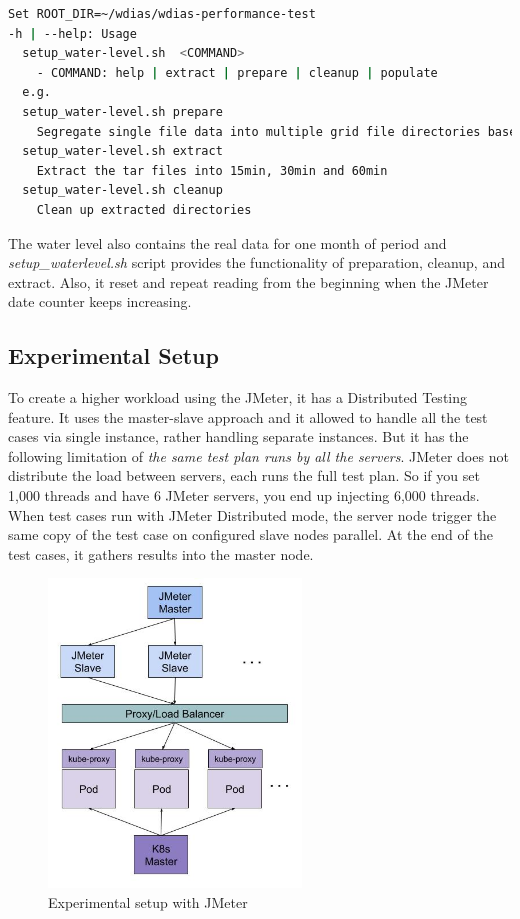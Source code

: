 \begin{lstlisting}[language=sh, caption= Preparation of water-level data.]
Set ROOT_DIR=~/wdias/wdias-performance-test
-h | --help: Usage
  setup_water-level.sh  <COMMAND>
    - COMMAND: help | extract | prepare | cleanup | populate
  e.g.
  setup_water-level.sh prepare
    Segregate single file data into multiple grid file directories based on date. And Separate into main directories of 15min, 30min, 60min and create tar files
  setup_water-level.sh extract
    Extract the tar files into 15min, 30min and 60min
  setup_water-level.sh cleanup
    Clean up extracted directories
\end{lstlisting}
The water level also contains the real data for one month of period and \emph{setup\_waterlevel.sh} script provides the functionality of preparation, cleanup, and extract.
Also, it reset and repeat reading from the beginning when the  JMeter date counter keeps increasing.


\subsection{Experimental Setup}
\label{subse:experimental_setup}

To create a higher workload using the  JMeter, it has a Distributed Testing feature. It uses the master-slave approach and it allowed to handle all the test cases via single instance, rather handling separate instances. But it has the following limitation of \emph{the same test plan runs by all the servers}.  JMeter does not distribute the load between servers, each runs the full test plan. So if you set 1,000 threads and have 6  JMeter servers, you end up injecting 6,000 threads. When test cases run with  JMeter Distributed mode, the server node trigger the same copy of the test case on configured slave nodes parallel. At the end of the test cases, it gathers results into the master node.

\begin{figure}[htp]
    \centering
    \includegraphics[width=0.6\textwidth]{results/work_load/experimental_setup_v3.jpg}
    \caption{Experimental setup with JMeter}
    \label{fi:experimental_setup}
\end{figure}

